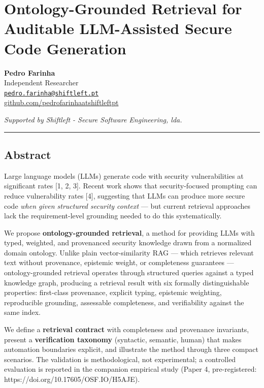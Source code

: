 \documentclass[
]{article}
\author{}
\date{}
\begin{document}
\section{Ontology-Grounded Retrieval for Auditable LLM-Assisted Secure
Code
Generation}\label{ontology-grounded-retrieval-for-auditable-llm-assisted-secure-code-generation}

\textbf{Pedro Farinha}\\
Independent Researcher\\
\href{mailto:pedro.farinha@shiftleft.pt}{\nolinkurl{pedro.farinha@shiftleft.pt}}\\
\href{https://github.com/pedrofarinhaatshiftleftpt}{github.com/pedrofarinhaatshiftleftpt}

\emph{Supported by Shiftleft - Secure Software Engineering, lda.}

\begin{center}\rule{0.5\linewidth}{0.5pt}\end{center}

\subsection{Abstract}\label{abstract}

Large language models (LLMs) generate code with security vulnerabilities
at significant rates {[}1, 2, 3{]}. Recent work shows that
security-focused prompting can reduce vulnerability rates {[}4{]},
suggesting that LLMs can produce more secure code \emph{when given
structured security context} --- but current retrieval approaches lack
the requirement-level grounding needed to do this systematically.

We propose \textbf{ontology-grounded retrieval}, a method for providing
LLMs with typed, weighted, and provenanced security knowledge drawn from
a normalized domain ontology. Unlike plain vector-similarity RAG ---
which retrieves relevant text without provenance, epistemic weight, or
completeness guarantees --- ontology-grounded retrieval operates through
structured queries against a typed knowledge graph, producing a
retrieval result with six formally distinguishable properties:
first-class provenance, explicit typing, epistemic weighting,
reproducible grounding, assessable completeness, and verifiability
against the same index.

We define a \textbf{retrieval contract} with completeness and provenance
invariants, present a \textbf{verification taxonomy} (syntactic,
semantic, human) that makes automation boundaries explicit, and
illustrate the method through three compact scenarios. The validation is
methodological, not experimental; a controlled evaluation is reported in
the companion empirical study (Paper 4, pre-registered:
https://doi.org/10.17605/OSF.IO/H5AJE).
\end{document}
